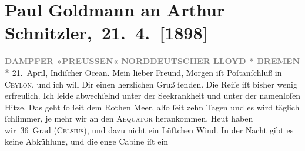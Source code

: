 

         
         \renewcommand{\erwaehntePersonen}{Personen: Richard Beer-Hofmann, Paul Goldmann, Marie Reinhard}
         \renewcommand{\erwaehnteInstitutionen}{Institutionen: Norddeutscher Lloyd, Preussen}
         \renewcommand{\erwaehnteOrte}{Orte: Bad Ischl, Bremen, China, Deutsches Postamt in Shanghai, Indischer Ozean, Rotes Meer, Sri Lanka, Wien}
         \renewcommand{\erwaehnteWerke}{}
               \section[ Paul Goldmann an Arthur Schnitzler, 21. 4. {[}1898{]}]{ Paul Goldmann an Arthur Schnitzler, 21. 4. {[}1898{]}}\nopagebreak{}\rehead{ }\begin{ledgroupsized}[t]{13cm}\normalsize\beginnumbering{} \toendnotes[C]{\smallbreak\pagebreak[2]} 
\toendnotes[C]{\smallbreak}\pstart
           \noindent{}\centering{}{\pb}\textcolor{gray}{\textbf{DAMPFER »PREUSSEN«}}\pend
           \pstart
           \noindent{}\textcolor{gray}{\textbf{NORDDEUTSCHER LLOYD * BREMEN *}}\pend
           \pstart
           \raggedleft{}21. April, Indiſcher Ocean.\pend
           \pstart\center{}Mein lieber Freund,\pend\pstart
           Morgen iſt Poſtanſchluß in \textsc{Ceylon}, und ich will Dir einen herzlichen Gruß ſenden.\pend
           \pstart
           Die Reiſe iſt bisher wenig erfreulich. Ich leide abwechſelnd unter der Seekrankheit
               und unter der namenloſen Hitze. Das geht ſo ſeit dem Rothen Meer, alſo ſeit zehn Tagen {\pb}und es wird täglich ſchlimmer, je mehr wir an den
                  \textsc{Aequator} herankommen. Heut haben wir 36 Grad (\textsc{Celsius}), und dazu nicht
               ein Lüftchen Wind. In der Nacht gibt es keine Abkühlung, und die enge Cabine iſt ein

\end{ledgroupsized}
